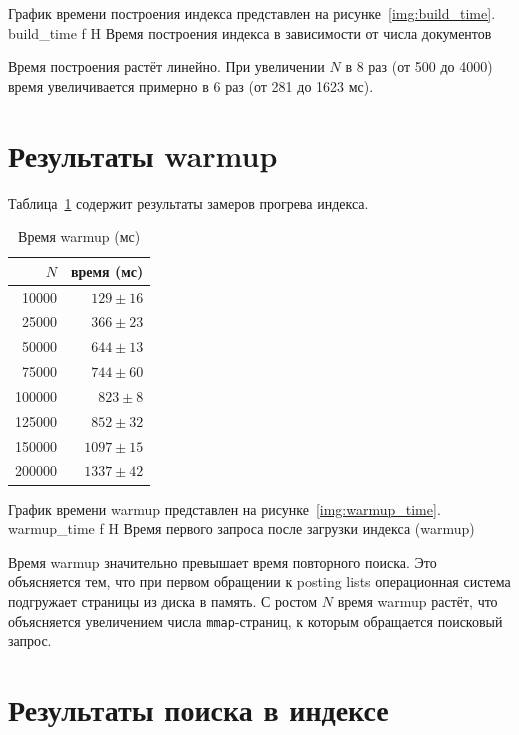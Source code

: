 \documentclass{itmo}
\begin{document}
График времени построения индекса представлен на рисунке~\ref{img:build_time}.
	{build_time}
	{f}
	{H}
	{\textwidth}
	{Время построения индекса в зависимости от числа документов}

Время построения растёт линейно.
При увеличении $N$ в 8 раз (от 500 до 4000) время увеличивается примерно в 6 раз (от 281 до 1623 мс).

\section{Результаты warmup}

Таблица~\ref{tab:warmup} содержит результаты замеров прогрева индекса.
\begin{table}[H]
	\centering
	\caption{Время warmup (мс)}
	\label{tab:warmup}
	\begin{tabular}{|r|r|}
		\toprule
		$N$ & время (мс) \\
		\midrule
		10000  & $129 \pm 16$  \\
		25000  & $366 \pm 23$  \\
		50000  & $644 \pm 13$  \\
		75000  & $744 \pm 60$  \\
		100000 & $823 \pm 8$   \\
		125000 & $852 \pm 32$  \\
		150000 & $1097 \pm 15$ \\
		200000 & $1337\pm 42$  \\
		\bottomrule
	\end{tabular}
\end{table}

График времени warmup представлен на рисунке~\ref{img:warmup_time}.
	{warmup_time}
	{f}
	{H}
	{\textwidth}
	{Время первого запроса после загрузки индекса (warmup)}

Время warmup значительно превышает время повторного поиска.
Это объясняется тем, что при первом обращении к posting lists операционная система подгружает страницы из диска в память.
С ростом $N$ время warmup растёт, что объясняется увеличением числа \texttt{mmap}-страниц, к которым обращается поисковый запрос.

\section{Результаты поиска в индексе}
\end{document}
